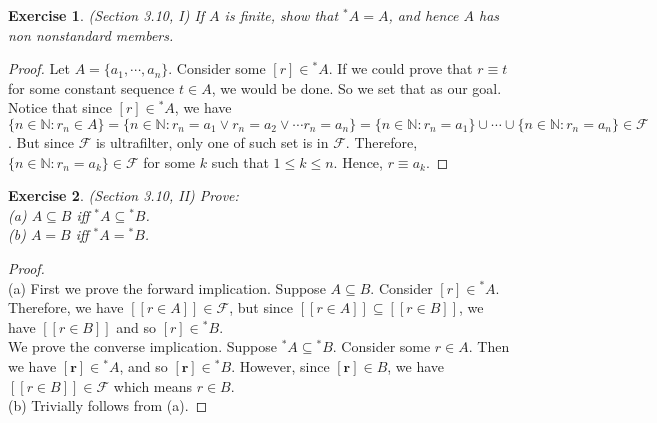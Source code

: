 \documentclass[a4paper, 11pt]{book}
\theoremstyle{plain}
\newtheorem{exercise}{Exercise}[chapter]
\theoremstyle{plain}
\newcommand{\mb}{\mathbf}
\newcommand{\mc}{\mathcal}
\newcommand{\N}{\mathbb{N}}
\begin{document}
  \begin{exercise} (Section 3.10, I)
    If $A$ is finite, show that ${}^*A=A$, and hence $A$ has non nonstandard members.
  \end{exercise}
  \begin{proof}
    Let $A=\{a_1,\cdots, a_n\}$. Consider some $[r] \in {}^* A$. If we could prove that $r \equiv t$ for some constant sequence $t \in A$, we would be done. So we set that as our goal. Notice that since $[r] \in {}^* A$, we have $\{ n \in \N: r_n \in A\}= \{n \in \N: r_n=a_1 \lor r_n=a_2 \lor \cdots r_n=a_n\}=\{n \in \N: r_n=a_1\} \cup \cdots \cup \{n \in \N:r_n=a_n\} \in \mc{F}$. But since $\mc{F}$ is ultrafilter, only one of such set is in $\mc{F}$. Therefore, $\{n \in \N: r_n=a_k\} \in \mc{F}$ for some $k$ such that $1 \leq k \leq n$. Hence, $r \equiv a_k$.
  \end{proof}

  \begin{exercise}
    (Section 3.10, II) 
    Prove: \\
    (a) $A \subseteq B$ iff ${}^* A \subseteq {}^* B$. \\
    (b) $A=B$ iff ${}^* A = {}^* B$.
  \end{exercise}
  \begin{proof} $ $ \\
    (a) First we prove the forward implication. Suppose $A \subseteq B$. Consider $[r] \in {}^* A$. Therefore, we have $[[r \in A]] \in \mc{F}$, but since $[[r \in A]] \subseteq [[r \in B]]$, we have $[[r \in B]]$ and so $[r] \in {}^* B$. \\
    We prove the converse implication. Suppose ${}^* A \subseteq {}^* B$. Consider some $r \in A$. Then we have $[\mb{r}] \in {}^* A$, and so $[\mb{r}] \in {}^*B$. However, since $[{\mb{r}}] \in B$, we have $[[r \in B]] \in \mc{F}$ which means $r \in B$. \\

    (b) Trivially follows from (a).
  \end{proof}
\end{document}
